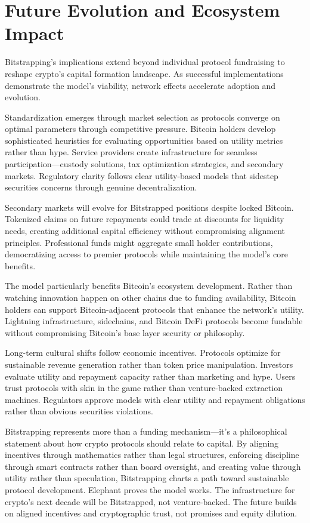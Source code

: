 \section{Future Evolution and Ecosystem Impact}

Bitstrapping's implications extend beyond individual protocol fundraising to reshape crypto's capital formation landscape. As successful implementations demonstrate the model's viability, network effects accelerate adoption and evolution.

Standardization emerges through market selection as protocols converge on optimal parameters through competitive pressure. Bitcoin holders develop sophisticated heuristics for evaluating opportunities based on utility metrics rather than hype. Service providers create infrastructure for seamless participation—custody solutions, tax optimization strategies, and secondary markets. Regulatory clarity follows clear utility-based models that sidestep securities concerns through genuine decentralization.

Secondary markets will evolve for Bitstrapped positions despite locked Bitcoin. Tokenized claims on future repayments could trade at discounts for liquidity needs, creating additional capital efficiency without compromising alignment principles. Professional funds might aggregate small holder contributions, democratizing access to premier protocols while maintaining the model's core benefits.

The model particularly benefits Bitcoin's ecosystem development. Rather than watching innovation happen on other chains due to funding availability, Bitcoin holders can support Bitcoin-adjacent protocols that enhance the network's utility. Lightning infrastructure, sidechains, and Bitcoin DeFi protocols become fundable without compromising Bitcoin's base layer security or philosophy.

Long-term cultural shifts follow economic incentives. Protocols optimize for sustainable revenue generation rather than token price manipulation. Investors evaluate utility and repayment capacity rather than marketing and hype. Users trust protocols with skin in the game rather than venture-backed extraction machines. Regulators approve models with clear utility and repayment obligations rather than obvious securities violations.

Bitstrapping represents more than a funding mechanism—it's a philosophical statement about how crypto protocols should relate to capital. By aligning incentives through mathematics rather than legal structures, enforcing discipline through smart contracts rather than board oversight, and creating value through utility rather than speculation, Bitstrapping charts a path toward sustainable protocol development. Elephant proves the model works. The infrastructure for crypto's next decade will be Bitstrapped, not venture-backed. The future builds on aligned incentives and cryptographic trust, not promises and equity dilution.